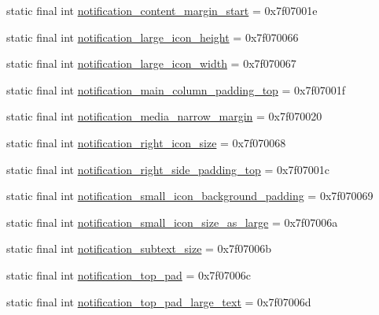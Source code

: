 \begin{CompactItemize}
static final int \hyperlink{classandroid_1_1support_1_1v7_1_1recyclerview_1_1_r_1_1dimen_1096d59454ba4deaeea9cfad60fae31b}{notification\_\-content\_\-margin\_\-start} = 0x7f07001e
\item 
static final int \hyperlink{classandroid_1_1support_1_1v7_1_1recyclerview_1_1_r_1_1dimen_ed6ec05736ee15e76790712680b26795}{notification\_\-large\_\-icon\_\-height} = 0x7f070066
\item 
static final int \hyperlink{classandroid_1_1support_1_1v7_1_1recyclerview_1_1_r_1_1dimen_189437df22ce676f1aa3dcf53008a486}{notification\_\-large\_\-icon\_\-width} = 0x7f070067
\item 
static final int \hyperlink{classandroid_1_1support_1_1v7_1_1recyclerview_1_1_r_1_1dimen_842698edd9a510b1a65b41b176023c47}{notification\_\-main\_\-column\_\-padding\_\-top} = 0x7f07001f
\item 
static final int \hyperlink{classandroid_1_1support_1_1v7_1_1recyclerview_1_1_r_1_1dimen_04ff9844b45e0db0d805259823fcc988}{notification\_\-media\_\-narrow\_\-margin} = 0x7f070020
\item 
static final int \hyperlink{classandroid_1_1support_1_1v7_1_1recyclerview_1_1_r_1_1dimen_936f2c16bb4a5138777e6269cc3e399b}{notification\_\-right\_\-icon\_\-size} = 0x7f070068
\item 
static final int \hyperlink{classandroid_1_1support_1_1v7_1_1recyclerview_1_1_r_1_1dimen_83445eff51af59754d4d3b35bc443aee}{notification\_\-right\_\-side\_\-padding\_\-top} = 0x7f07001c
\item 
static final int \hyperlink{classandroid_1_1support_1_1v7_1_1recyclerview_1_1_r_1_1dimen_6d83d95c7656962adee8e30ee9e4888c}{notification\_\-small\_\-icon\_\-background\_\-padding} = 0x7f070069
\item 
static final int \hyperlink{classandroid_1_1support_1_1v7_1_1recyclerview_1_1_r_1_1dimen_4a50a31543629091eb0a1883d3152a64}{notification\_\-small\_\-icon\_\-size\_\-as\_\-large} = 0x7f07006a
\item 
static final int \hyperlink{classandroid_1_1support_1_1v7_1_1recyclerview_1_1_r_1_1dimen_9dc4696b3423bfe812173e94fbb5a983}{notification\_\-subtext\_\-size} = 0x7f07006b
\item 
static final int \hyperlink{classandroid_1_1support_1_1v7_1_1recyclerview_1_1_r_1_1dimen_ad067d44408828f037bfbb401aa7891f}{notification\_\-top\_\-pad} = 0x7f07006c
\item 
static final int \hyperlink{classandroid_1_1support_1_1v7_1_1recyclerview_1_1_r_1_1dimen_c89ac9deccb807e67ab3f941ecdbef90}{notification\_\-top\_\-pad\_\-large\_\-text} = 0x7f07006d
\end{CompactItemize}


